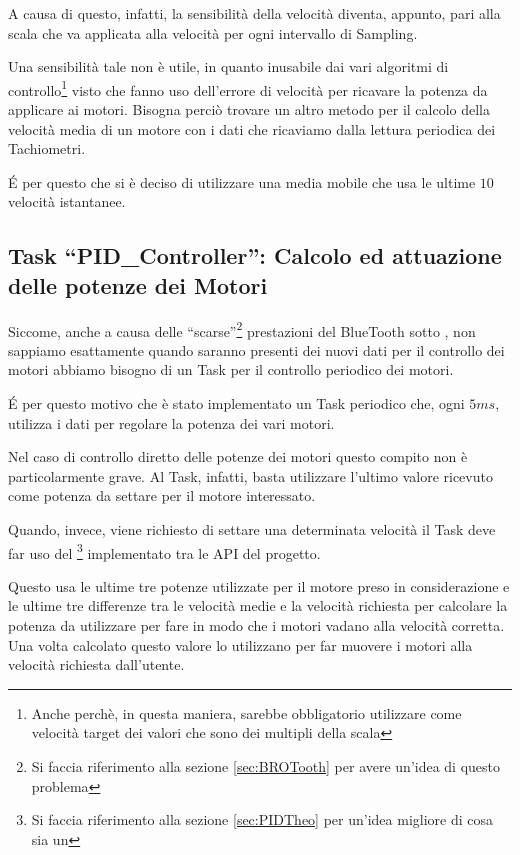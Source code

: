 A causa di questo, infatti, la sensibilità della velocità diventa, appunto,
pari alla scala che va applicata alla velocità per ogni intervallo di
Sampling.

Una sensibilità tale non è utile, in quanto inusabile dai vari algoritmi
di controllo\footnote{Anche perchè, in questa maniera, sarebbe obbligatorio
utilizzare come velocità target dei valori che sono dei multipli della
scala} visto che fanno uso dell'errore di velocità per ricavare la potenza da
applicare ai motori. Bisogna perciò trovare un altro metodo per il calcolo della
velocità media di un motore con i dati che ricaviamo dalla lettura
periodica dei Tachiometri.

\'E per questo che si è deciso di utilizzare una media mobile che usa le
ultime $10$ velocità istantanee.

\subsection[Task ``PID\_Controller'']{Task ``PID\_Controller'': Calcolo ed
attuazione delle potenze dei Motori}\label{sec:BROPIDS}
Siccome, anche a causa delle ``scarse''\footnote{Si faccia riferimento alla
sezione \ref{sec:BROTooth} per avere un'idea di questo problema}
prestazioni del BlueTooth sotto \nxtOSEK{}, non sappiamo esattamente quando 
saranno presenti dei nuovi dati per il controllo dei motori abbiamo bisogno
di un Task per il controllo periodico dei motori.

\'E per questo motivo che è stato implementato un Task periodico che, ogni
$5ms$, utilizza i dati per regolare la potenza dei vari motori.

Nel caso di controllo diretto delle potenze dei motori questo compito non è
particolarmente grave. Al Task, infatti, basta utilizzare l'ultimo valore
ricevuto come potenza da settare per il motore interessato.

Quando, invece, viene richiesto di settare una determinata velocità il Task
deve far uso del \PID{}\footnote{Si faccia riferimento alla sezione
\ref{sec:PIDTheo} per un'idea migliore di cosa sia un \PID{}} implementato
tra le API del progetto.

Questo usa le ultime tre potenze utilizzate per il motore preso in
considerazione e le ultime tre differenze tra le velocità medie e la
velocità richiesta per calcolare la potenza da utilizzare per fare in modo
che i motori vadano alla velocità corretta. Una volta calcolato questo
valore lo utilizzano per far muovere i motori alla velocità richiesta
dall'utente.

